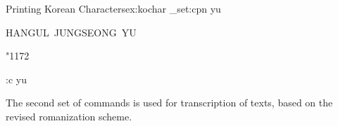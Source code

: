 \begin{texexample}{Printing Korean Characters}{ex:kochar}
\ExplSyntaxOn
\cs_set:cpn {yu}
  {
    HANGUL~JUNGSEONG~YU\par 
    \space
    \large
    \begingroup
      \korean
      \centering
      \char"1172 
    \endgroup
  }
\use:c {yu}
\ExplSyntaxOff
\end{texexample}

The second set of commands is used for transcription of texts, based on the revised romanization scheme. 















